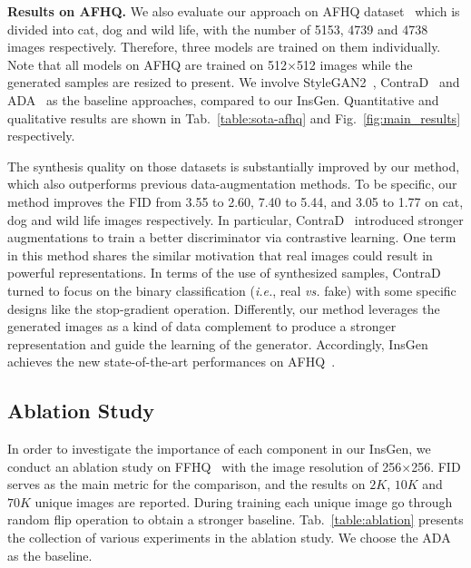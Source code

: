 \documentclass{article}
\begin{document}
\noindent\textbf{Results on AFHQ.}
We also evaluate our approach on AFHQ dataset~\cite{choi2020starganv2} which is divided into cat, dog and wild life, with the number of 5153, 4739 and 4738 images respectively. Therefore, three models are trained on them individually. Note that all models on AFHQ are trained on 512$\times$512 images while the generated samples are resized to present. We involve StyleGAN2~\cite{Karras2019stylegan2}, ContraD~\cite{jeong2021training} and ADA~\cite{karras2020training} as the baseline approaches, compared to our InsGen.  Quantitative and qualitative results are shown in Tab.~\ref{table:sota-afhq} and Fig.~\ref{fig:main_results} respectively.


The synthesis quality on those datasets is substantially improved by our method, which also outperforms previous data-augmentation methods. To be specific, our method improves the FID from 3.55 to 2.60, 7.40 to 5.44, and 3.05 to 1.77 on cat, dog and wild life images  respectively. In particular, ContraD~\cite{jeong2021training} introduced stronger augmentations to train a better discriminator via contrastive learning. One term in this method shares the similar motivation that real images could result in powerful representations. In terms of the use of synthesized samples, ContraD turned to focus on the binary classification (\textit{i.e.}, real \textit{vs.} fake) with some specific designs like the stop-gradient operation. Differently, our method leverages the generated images as a kind of data complement to produce a stronger representation and guide the learning of the generator. Accordingly, InsGen achieves the new state-of-the-art performances on AFHQ~\cite{choi2020starganv2}.


\subsection{Ablation Study}\label{subsec:ablation}


In order to investigate the importance of each component in our InsGen, we conduct an ablation study on FFHQ~\cite{karras2019style} with the image resolution of 256$\times$256. FID serves as the main metric for the comparison, and the results on $2K$, $10K$ and $70K$ unique images are reported. During training each unique image go through random flip operation to obtain a stronger baseline. Tab.~\ref{table:ablation} presents the collection of various experiments in the ablation study. We choose the ADA~\cite{karras2020training} as the baseline.
\end{document}

